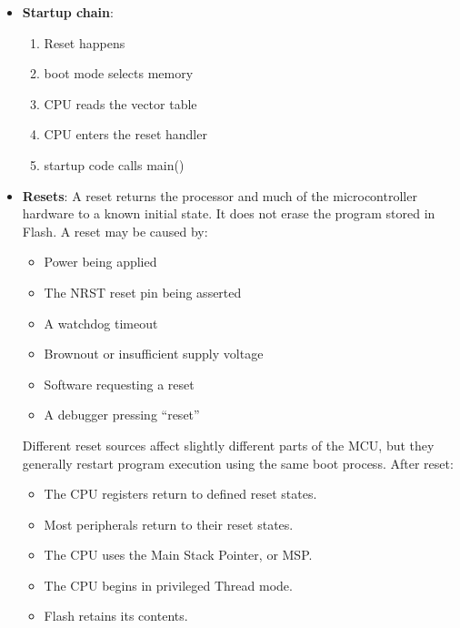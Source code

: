 \documentclass{report}
\begin{document}
\begin{itemize}
            \bigbreak \noindent 
            and r1 contains 0x20000100, that address is placed onto the MCU’s internal bus. The bus interconnect routes it directly to the SRAM hardware.
            \bigbreak \noindent 
            Memory on the MCU is usually not virtual
        \item \textbf{Startup chain}: 
            \begin{enumerate}
                \item Reset happens 
                \item boot mode selects memory 
                \item CPU reads the vector table 
                \item CPU enters the reset handler 
                \item startup code calls main()
            \end{enumerate}
        \item \textbf{Resets}: A reset returns the processor and much of the microcontroller hardware to a known initial state. It does not erase the program stored in Flash.
            \bigbreak \noindent 
            A reset may be caused by:
            \begin{itemize}
                \item Power being applied
                \item The NRST reset pin being asserted
                \item A watchdog timeout
                \item Brownout or insufficient supply voltage
                \item Software requesting a reset
                \item A debugger pressing “reset”
            \end{itemize}
            Different reset sources affect slightly different parts of the MCU, but they generally restart program execution using the same boot process. 
            \bigbreak \noindent 
            After reset:
            \begin{itemize}
                \item The CPU registers return to defined reset states.
                \item Most peripherals return to their reset states.
                \item The CPU uses the Main Stack Pointer, or MSP.
                \item The CPU begins in privileged Thread mode.
                \item Flash retains its contents.

\end{itemize}
\end{itemize}
\end{document}
